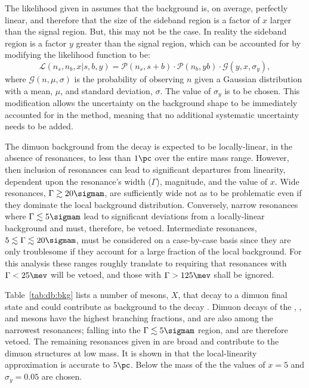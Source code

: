 The likelihood given in  assumes that the background is, on average, perfectly
linear, and therefore that the size of the sideband region is a factor of $x$ larger than the
signal region.
But, this may not be the case.
In reality the sideband region is a factor $y$ greater than the signal region, which can be
accounted for by modifying the likelihood function to be:
\begin{equation}
  \mathcal{L}(n_s, n_b, x | s, b, y) =
  \mathcal{P}(n_s, s+b) \cdot
  \mathcal{P}(n_b, yb) \cdot
  \mathcal{G}(y,x,\sigma_y),
  \label{eq:db:like2}
\end{equation}
where $\mathcal{G}(n, \mu, \sigma)$ is the probability of observing $n$ given a Gaussian
distribution with a mean, $\mu$, and standard deviation, $\sigma$.
The value of $\sigma_y$ is to be chosen.
This modification allows the uncertainty on the background shape to be immediately accounted for in
the method, meaning that no additional systematic uncertainty needs to be added.

The dimuon background from the \sm decay \btokstrmumu is expected to be locally-linear, in the
absence of resonances, to less than $1\pc$ over the entire mass range.
However, then inclusion of resonances can lead to significant departures from linearity, dependent
upon the resonance's width ($\Gamma$), magnitude, and the value of $x$.
Wide resonances, $\Gamma\gtrsim20\sigmam$, are sufficiently wide not as to be problematic even if
they dominate the local background distribution.
Conversely, narrow resonances where $\Gamma\lesssim5\sigmam$ lead to significant deviations from a
locally-linear background and must, therefore, be vetoed.
Intermediate resonances, $5\lesssim\Gamma\lesssim20\sigmam$, must be considered on a case-by-case
basis since they are only troublesome if they account for a large fraction of the local background.
For this analysis these ranges roughly translate to requiring that resonances with $\Gamma<25\mev$
will be vetoed, and those with $\Gamma>125\mev$ shall be ignored.

Table~\ref{tab:db:bkg} lists a number of mesons, $X$, that decay to a dimuon final state and could
contribute as background to the decay \decay{\Bd}{\Kstarz\mumu}.
Dimuon decays of the \phii, \jpsi, and \psitwos mesons have the highest branching fractions, and
are also among the
narrowest resonances; falling into the $\Gamma\lesssim5\sigmam$ region, and are therefore vetoed.
The remaining resonances given in  are broad and contribute to the dimuon
structures at low mass.
It is shown in  that the local-linearity approximation is accurate to
\approx$5\pc$.
Below the mass of the \jpsi the values of $x=5$ and $\sigma_y=0.05$ are chosen.


